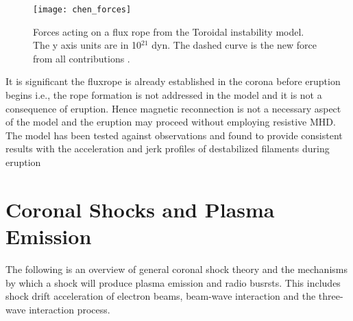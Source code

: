 \begin{figure}[!t]
\begin{center}
\texttt{[image: chen\_forces]}
\caption[The toroidal instability forces]{Forces acting on a flux rope from the Toroidal instability model. The y axis units are in 10$^{21}$ dyn. The dashed curve is the new force from all contributions \citep{chen1989}.}
\label{fig:chen_forces}
\end{center}
\end{figure}

It is significant the fluxrope is already established in the corona before eruption begins i.e., the rope formation is not addressed in the model and it is not a consequence of eruption. Hence magnetic reconnection is not a necessary aspect of the model and the eruption may proceed without employing resistive MHD. The model has been tested against observations and found to provide consistent results with the acceleration and jerk profiles of destabilized filaments during eruption \citep{schrijver2008}

\section{Coronal Shocks and Plasma Emission}\label{sec:3}

The following is an overview of general coronal shock theory and the mechanisms by which a shock will produce plasma emission and radio busrsts. This includes shock drift acceleration of electron beams, beam-wave interaction and the three-wave interaction process. 

